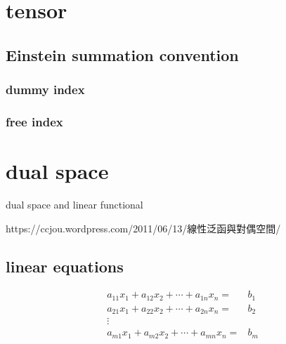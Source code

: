 \documentclass[
]{book}
\theoremstyle{definition}
\theoremstyle{definition}
\theoremstyle{definition}
\theoremstyle{definition}
\theoremstyle{remark}
\begin{document}
\chapter{tensor}\label{tensor}

\section{Einstein summation convention}\label{einstein-summation-convention}

\subsection{dummy index}\label{dummy-index}

\subsection{free index}\label{free-index}

\chapter{dual space}\label{dual-space}

dual space and linear functional

\begin{CJK}{UTF8}{bsmi}
https://ccjou.wordpress.com/2011/06/13/線性泛函與對偶空間/
\end{CJK}

\section{linear equations}\label{linear-equations}

\[
\begin{aligned}
a_{{\scriptscriptstyle 11}}x_{{\scriptscriptstyle 1}}+a_{{\scriptscriptstyle 12}}x_{{\scriptscriptstyle 2}}+\cdots+a_{{\scriptscriptstyle 1n}}x_{{\scriptscriptstyle n}}= & b_{{\scriptscriptstyle 1}}\\
a_{{\scriptscriptstyle 21}}x_{{\scriptscriptstyle 1}}+a_{{\scriptscriptstyle 22}}x_{{\scriptscriptstyle 2}}+\cdots+a_{{\scriptscriptstyle 2n}}x_{{\scriptscriptstyle n}}= & b_{{\scriptscriptstyle 2}}\\
\vdots\\
a_{{\scriptscriptstyle m1}}x_{{\scriptscriptstyle 1}}+a_{{\scriptscriptstyle m2}}x_{{\scriptscriptstyle 2}}+\cdots+a_{{\scriptscriptstyle mn}}x_{{\scriptscriptstyle n}}= & b_{{\scriptscriptstyle m}}
\end{aligned}
\]
\end{document}
